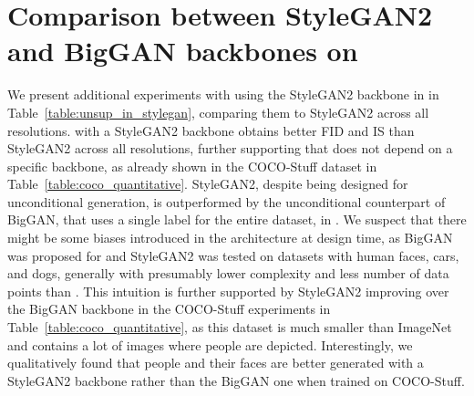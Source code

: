 \section{Comparison between StyleGAN2 and BigGAN backbones on \ImNet}
\label{app:stylegan_biggan}
We present additional experiments with \ours using the StyleGAN2 backbone in \ImNet in Table~\ref{table:unsup_in_stylegan}, comparing them to StyleGAN2 across all resolutions. \ours with a StyleGAN2 backbone obtains better FID and IS than StyleGAN2 across all resolutions, further supporting that \ours does not depend on a specific backbone, as already shown in the COCO-Stuff dataset in Table~\ref{table:coco_quantitative}. StyleGAN2, despite being designed for unconditional generation, is outperformed by the unconditional counterpart of BigGAN, that uses a single label for the entire dataset, in \ImNet. We suspect that there might be some biases introduced in the architecture at design time, as BigGAN was proposed for \ImNet and StyleGAN2 was tested on datasets with human faces, cars, and dogs, generally with presumably lower complexity and less number of data points than \ImNet. This intuition is further supported by StyleGAN2 improving over the BigGAN backbone in the COCO-Stuff experiments in Table~\ref{table:coco_quantitative}, as this dataset is much smaller than ImageNet and contains a lot of images where people are depicted. Interestingly, we qualitatively found that people and their faces are better generated with a StyleGAN2 backbone rather than the BigGAN one when trained on COCO-Stuff.


